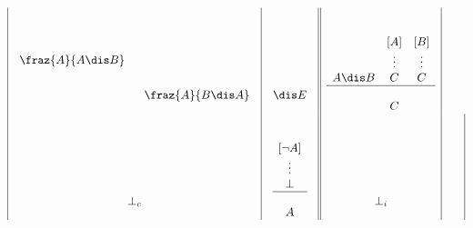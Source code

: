\begin{figure}[htbp]
\[\begin{array}{|c|c||c|c|}
\begin{array}{c}
	\fraz{A}
	     {A \dis B}
	\end{array}
	\ \ 
	\begin{array}{c}
	\\ \\ \\ \\ \\
	\fraz{A}
  	   {B \dis A}
	\end{array}
	&
	\begin{array}{l}
	\\ \\ \\ \\ \\
	\dis E  
	\end{array}
	& 
	\begin{array}{ccc}
	\\ \\
	&{[A]}&{[B]}\\
	&\vdots&\vdots\\
	A \dis B & C & C\\
	\hline\\
	& C &
	\end{array}
	\\
	\begin{array}{l}
	\\ \\ \\ \\ \\
	\bot_c 
	\end{array}
	&
	\begin{array}{c}
	\\ \\
	{[\neg A]}\\
	\vdots\\
	\bot\\
	\hline\\
	A 
	\end{array}
	&
	\begin{array}{l}
	\\ \\ \\ \\ \\
	\bot_i  
	\end{array}
	& 
	\begin{array}{c}
	\\ \\ \\ \\ \\

\end{array}
\end{array}\]
\end{figure}
